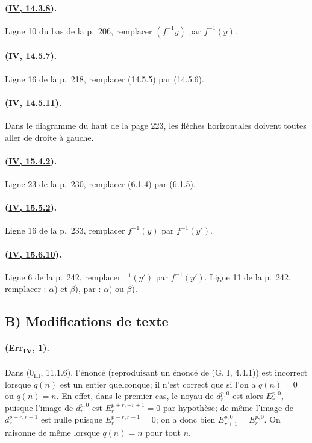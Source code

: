 \paragraph{({\texorpdfstring{\protect\hyperlink{ega4.c04.prop.14-3-8}{IV, 14.3.8}}{IV, 14.3.8}}).}
Ligne 10 du bas de la p.~206, remplacer $(f^{-1}y)$ par $f^{-1}(y)$.

\paragraph{({\texorpdfstring{\protect\hyperlink{ega4.c04.rem.14-5-7}{IV, 14.5.7}}{IV, 14.5.7}}).}
Ligne 16 de la p.~218, remplacer (14.5.5) par (14.5.6).

\paragraph{({\texorpdfstring{\protect\hyperlink{ega4.c04.cor.14-5-11}{IV, 14.5.11}}{IV, 14.5.11}}).}
Dans le diagramme du haut de la page 223, les flèches horizontales
doivent toutes aller de droite à gauche.

\paragraph{({\texorpdfstring{\protect\hyperlink{ega4.c04.prop.15-4-2}{IV, 15.4.2}}{IV, 15.4.2}}).}
Ligne 23 de la p.~230, remplacer (6.1.4) par (6.1.5).

\paragraph{({\texorpdfstring{\protect\hyperlink{ega4.c04.cor.15-5-2}{IV, 15.5.2}}{IV, 15.5.2}}).}
Ligne 16 de la p.~233, remplacer $f^{-1}(y)$ par $f^{-1}(y')$.

\paragraph{({\texorpdfstring{\protect\hyperlink{ega4.c04.item.15-6-10}{IV, 15.6.10}}{IV, 15.6.10}}).}
Ligne 6 de la p.~242, remplacer ${}^{-1}(y')$ par $f^{-1}(y')$.
Ligne 11 de la p.~242, remplacer : $\alpha$) et $\beta$), par :
$\alpha$) ou $\beta$).

\subsection*{B) Modifications de texte}

\paragraph{(Err\textsubscript{IV}, 1).}
Dans ($0_{\mathrm{III}}$, 11.1.6), l'énoncé (reproduisant un énoncé de
(G, I, 4.4.1)) est incorrect lorsque $q(n)$ est un entier quelconque;
il n'est correct que si l'on a $q(n)=0$ ou $q(n)=n$. En effet, dans le
premier cas, le noyau de $d_r^{p,0}$ est alors $E_r^{p,0}$, puisque
l'image de $d_r^{p,0}$ est $E_r^{p+r,-r+1}=0$ par hypothèse; de même
l'image de $d_r^{p-r,r-1}$ est nulle puisque
$E_r^{p-r,r-1}=0$; on a donc bien $E_{r+1}^{p,0}=E_r^{p,0}$. On
raisonne de même lorsque $q(n)=n$ pour tout $n$.

